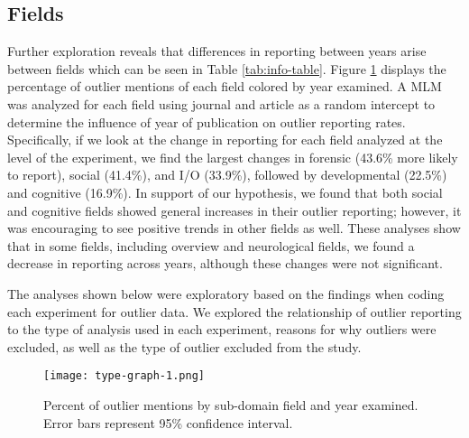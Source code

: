 \documentclass[english,,man,mask]{apa6}
\theoremstyle{definition}
\theoremstyle{definition}
\theoremstyle{definition}
\theoremstyle{remark}
\begin{document}
\subsection{Fields}\label{fields-1}

Further exploration reveals that differences in reporting between years
arise between fields which can be seen in Table \ref{tab:info-table}.
Figure \ref{fig:type-graph} displays the percentage of outlier mentions
of each field colored by year examined. A MLM was analyzed for each
field using journal and article as a random intercept to determine the
influence of year of publication on outlier reporting rates.
Specifically, if we look at the change in reporting for each field
analyzed at the level of the experiment, we find the largest changes in
forensic (43.6\% more likely to report), social (41.4\%), and I/O
(33.9\%), followed by developmental (22.5\%) and cognitive (16.9\%). In
support of our hypothesis, we found that both social and cognitive
fields showed general increases in their outlier reporting; however, it
was encouraging to see positive trends in other fields as well. These
analyses show that in some fields, including overview and neurological
fields, we found a decrease in reporting across years, although these
changes were not significant.

The analyses shown below were exploratory based on the findings when
coding each experiment for outlier data. We explored the relationship of
outlier reporting to the type of analysis used in each experiment,
reasons for why outliers were excluded, as well as the type of outlier
excluded from the study.

\begin{figure}
\centering
\texttt{[image: type-graph-1.png]}
\caption{\label{fig:type-graph}Percent of outlier mentions by sub-domain
field and year examined. Error bars represent 95\% confidence interval.}
\end{figure}
\end{document}

